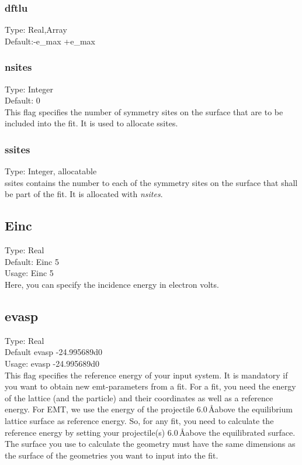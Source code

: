 \documentclass[twoside, 11pt, titlepage, captions=nooneline, a4paper, headsepline]{scrbook}%
\begin{document}
\subsubsection*{dftlu}
Type: Real,Array\\
Default:-e\_max +e\_max\\
\subsubsection*{nsites}
Type: Integer\\
Default: 0\\
This flag specifies the number of symmetry sites on the surface that are to be included into the fit. It is used to allocate ssites.

\subsubsection*{ssites}
Type: Integer, allocatable\\
ssites contains the number to each of the symmetry sites on the surface that shall be part of the fit. It is allocated with \textit{nsites}.



\subsection*{Einc}
Type: Real\\
Default: Einc 5\\
Usage: Einc 5\\
Here, you can specify the incidence energy in electron volts.

\subsection*{evasp}
Type: Real\\
Default evasp -24.995689d0 \\
Usage: evasp -24.995689d0 \\
This flag specifies the reference energy of your input system. It is mandatory if you want to obtain new emt-parameters from a fit. For a fit, you need the energy of the lattice (and the particle) and their coordinates as well as a reference energy. For EMT, we use the energy of the projectile 6.0\,\AA above the equilibrium lattice surface as reference energy. So, for any fit, you need to calculate the reference energy by setting your projectile(s) 6.0\,\AA above the equilibrated surface. The surface you use to calculate the geometry must have the same dimensions as the surface of the geometries you want to input into the fit.
\end{document}
